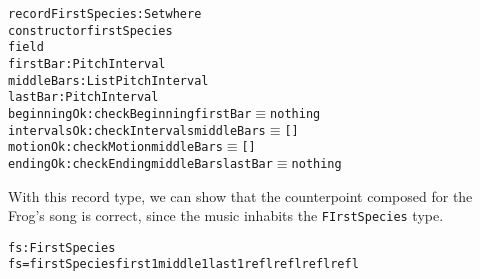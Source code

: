 \begin{alltt}
record FirstSpecies : Set where
  constructor firstSpecies
  field
    firstBar    : PitchInterval
    middleBars  : List PitchInterval
    lastBar     : PitchInterval
    beginningOk : checkBeginning firstBar \(\equiv\) nothing
    intervalsOk : checkIntervals middleBars \(\equiv\) []
    motionOk    : checkMotion middleBars \(\equiv\) []
    endingOk    : checkEnding middleBars lastBar \(\equiv\) nothing
\end{alltt}

With this record type, we can show that the counterpoint composed
for the Frog's song is correct, since the music inhabits the
\texttt{FIrstSpecies} type.

\begin{alltt}
fs : FirstSpecies
fs = firstSpecies first1 middle1 last1 refl refl refl refl
\end{alltt}